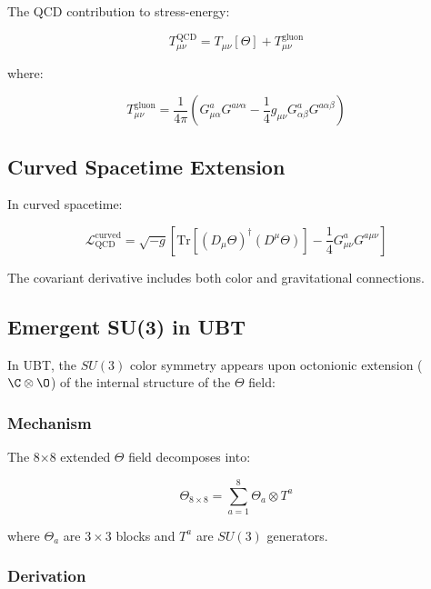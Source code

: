 The QCD contribution to stress-energy:

\begin{equation}
\label{eq:canonical:qcd_stress_energy}
T_{\mu\nu}^{\text{QCD}} = T_{\mu\nu}[\Theta] + T_{\mu\nu}^{\text{gluon}}
\end{equation}

where:

\begin{equation}
T_{\mu\nu}^{\text{gluon}} = \frac{1}{4\pi}\left(G^a_{\mu\alpha}G^{a\nu\alpha} - \frac{1}{4}g_{\mu\nu}G^a_{\alpha\beta}G^{a\alpha\beta}\right)
\end{equation}

\subsection{Curved Spacetime Extension}

In curved spacetime:

\begin{equation}
\label{eq:canonical:qcd_curved}
\mathcal{L}_{\text{QCD}}^{\text{curved}} = \sqrt{-g}\left[\text{Tr}\left[(D_\mu\Theta)^\dagger (D^\mu\Theta)\right] - \frac{1}{4} G^a_{\mu\nu} G^{a\mu\nu}\right]
\end{equation}

The covariant derivative includes both color and gravitational connections.

\subsection{Emergent SU(3) in UBT}
\label{sec:canonical:emergent_su3}

In UBT, the $SU(3)$ color symmetry appears upon octonionic extension ($\C \otimes \O$) of the internal structure of the $\Theta$ field:

\subsubsection{Mechanism}

The 8×8 extended $\Theta$ field decomposes into:

\begin{equation}
\Theta_{8 \times 8} = \sum_{a=1}^{8} \Theta_a \otimes T^a
\end{equation}

where $\Theta_a$ are $3 \times 3$ blocks and $T^a$ are $SU(3)$ generators.

\subsubsection{Derivation}


